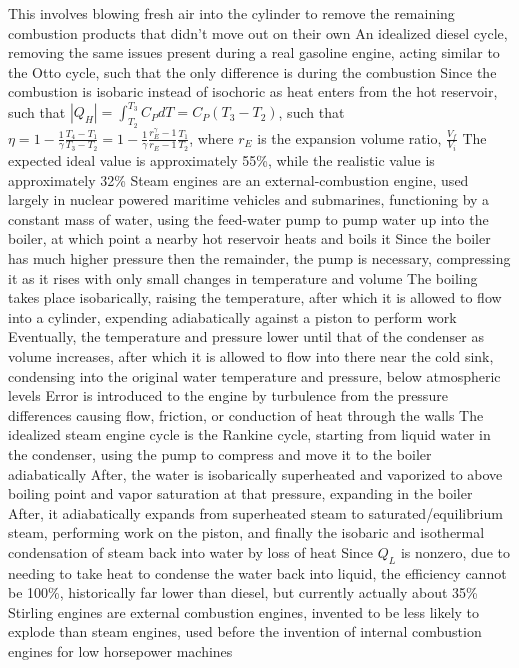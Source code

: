 \documentclass[11 pt, twoside]{article}
\newenvironment{outline*}
{
	\begin{outline}[enumerate]
	}
	{\end{outline}
}
\begin{document}
\begin{outline*}
\3 This involves blowing fresh air into the cylinder to remove the remaining combustion products that didn't move out on their own
\2 An idealized diesel cycle, removing the same issues present during a real gasoline engine, acting similar to the Otto cycle, such that the only difference is during the combustion
\3 Since the combustion is isobaric instead of isochoric as heat enters from the hot reservoir, such that $|Q_H| = \int^{T_3}_{T_2} C_P dT = C_P(T_3 - T_2)$, such that $\eta = 1 - \frac{1}{\gamma}\frac{T_4 - T_1}{T_3 - T_2} = 1 - \frac{1}{\gamma}\frac{r^\gamma_E - 1}{r_E - 1}\frac{T_1}{T_2}$, where $r_E$ is the expansion volume ratio, $\frac{V_f}{V_i}$
\3 The expected ideal value is approximately 55\%, while the realistic value is approximately 32\%
\1 Steam engines are an external-combustion engine, used largely in nuclear powered maritime vehicles and submarines, functioning by a constant mass of water, using the feed-water pump to pump water up into the boiler, at which point a nearby hot reservoir heats and boils it
\2 Since the boiler has much higher pressure then the remainder, the pump is necessary, compressing it as it rises with only small changes in temperature and volume
\3 The boiling takes place isobarically, raising the temperature, after which it is allowed to flow into a cylinder, expending adiabatically against a piston to perform work
\3 Eventually, the temperature and pressure lower until that of the condenser as volume increases, after which it is allowed to flow into there near the cold sink, condensing into the original water temperature and pressure, below atmospheric levels
\2 Error is introduced to the engine by turbulence from the pressure differences causing flow, friction, or conduction of heat through the walls
\2 The idealized steam engine cycle is the Rankine cycle, starting from liquid water in the condenser, using the pump to compress and move it to the boiler adiabatically
\3 After, the water is isobarically superheated and vaporized to above boiling point and vapor saturation at that pressure, expanding in the boiler
\3 After, it adiabatically expands from superheated steam to saturated/equilibrium steam, performing work on the piston, and finally the isobaric and isothermal condensation of steam back into water by loss of heat
\2 Since $Q_L$ is nonzero, due to needing to take heat to condense the water back into liquid, the efficiency cannot be 100\%, historically far lower than diesel, but currently actually about 35\%
\1 Stirling engines are external combustion engines, invented to be less likely to explode than steam engines, used before the invention of internal combustion engines for low horsepower machines

\end{outline*}
\end{document}
